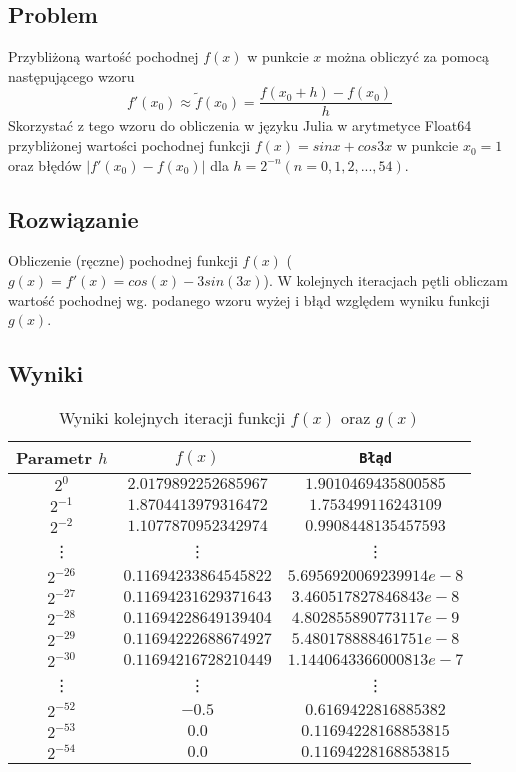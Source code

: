 \documentclass{article}
\begin{document}
        \subsection{Problem}
            Przybliżoną wartość pochodnej $f(x)$ w punkcie $x$ można obliczyć za pomocą następującego wzoru
            $$
                f'(x_0)\approx\tilde{f}(x_0) = \frac{f(x_0 + h) - f(x_0)}{h}
            $$
            Skorzystać z tego wzoru do obliczenia w języku Julia w arytmetyce Float64 przybliżonej
            wartości pochodnej funkcji $f(x) = sin x + cos 3x$ w punkcie $x_0 = 1$ oraz błędów $|f'(x_0) - f(x_0)|$ dla $h = 2^{-n} (n = 0, 1, 2, . . . , 54)$.
        \subsection{Rozwiązanie}
            Obliczenie (ręczne) pochodnej funkcji $f(x)$ ($g(x) = f'(x) = cos(x) - 3sin(3x)$).
            W kolejnych iteracjach pętli obliczam wartość pochodnej wg. podanego wzoru wyżej i błąd względem wyniku funkcji $g(x)$.
        \subsection{Wyniki}
            {\small
            \begin{table}[h!]
            \centering
            \begin{tabular}{c c c}
                \hline
                 Parametr $h$ & $f(x)$ & \texttt{Błąd} \\
                 \hline
                $2^{0}$ & $2.0179892252685967      $ & $1.9010469435800585$ \\
                $2^{-1}$ & $1.8704413979316472      $ & $1.753499116243109$ \\
                $2^{-2}$ & $1.1077870952342974      $ & $0.9908448135457593$ \\
                \vdots & \vdots & \vdots \\
                $2^{-26}$ & $0.11694233864545822     $ & $5.6956920069239914e-8$ \\
                $2^{-27}$ & $0.11694231629371643     $ & $3.460517827846843e-8$ \\
                $2^{-28}$ & $0.11694228649139404     $ & $4.802855890773117e-9$ \\
                $2^{-29}$ & $0.11694222688674927     $ & $5.480178888461751e-8$ \\
                $2^{-30}$ & $0.11694216728210449     $ & $1.1440643366000813e-7$ \\
                \vdots & \vdots & \vdots \\
                $2^{-52}$ & $-0.5                    $ & $0.6169422816885382$ \\
                $2^{-53}$ & $0.0                     $ & $0.11694228168853815$ \\
                $2^{-54}$ & $0.0                     $ & $0.11694228168853815$ \\
                \hline
            \end{tabular}
            \caption{Wyniki kolejnych iteracji funkcji $f(x)$ oraz $g(x)$}
            \label{table:derivative}
            \end{table}
            }
\end{document}
